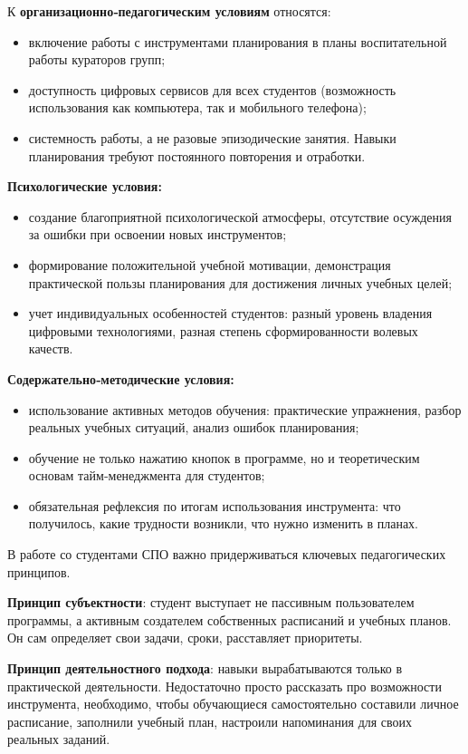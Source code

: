 \documentclass[14pt,a4paper]{article}
\begin{document}
К \textbf{организационно‑педагогическим условиям} относятся:
\begin{itemize}
    \item включение работы с инструментами планирования в планы воспитательной работы кураторов групп;
    \item доступность цифровых сервисов для всех студентов (возможность использования как компьютера, так и мобильного телефона);
    \item системность работы, а не разовые эпизодические занятия. Навыки планирования требуют постоянного повторения и отработки.
\end{itemize}

\textbf{Психологические условия:}
\begin{itemize}
    \item создание благоприятной психологической атмосферы, отсутствие осуждения за ошибки при освоении новых инструментов;
    \item формирование положительной учебной мотивации, демонстрация практической пользы планирования для достижения личных учебных целей;
    \item учет индивидуальных особенностей студентов: разный уровень владения цифровыми технологиями, разная степень сформированности волевых качеств.
\end{itemize}

\textbf{Содержательно‑методические условия:}
\begin{itemize}
    \item использование активных методов обучения: практические упражнения, разбор реальных учебных ситуаций, анализ ошибок планирования;
    \item обучение не только нажатию кнопок в программе, но и теоретическим основам тайм‑менеджмента для студентов;
    \item обязательная рефлексия по итогам использования инструмента: что получилось, какие трудности возникли, что нужно изменить в планах.
\end{itemize}

В работе со студентами СПО важно придерживаться ключевых педагогических принципов.

\textbf{Принцип субъектности}: студент выступает не пассивным пользователем программы, а активным создателем собственных расписаний и учебных планов. Он сам определяет свои задачи, сроки, расставляет приоритеты.

\textbf{Принцип деятельностного подхода}: навыки вырабатываются только в практической деятельности. Недостаточно просто рассказать про возможности инструмента, необходимо, чтобы обучающиеся самостоятельно составили личное расписание, заполнили учебный план, настроили напоминания для своих реальных заданий.
\end{document}
